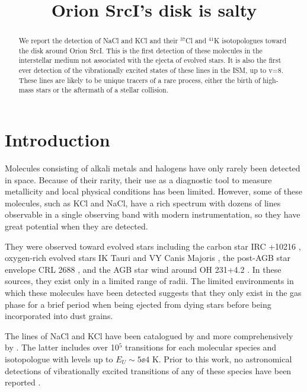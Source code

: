 \documentclass[twocolumn]{aastex62}
\newcommand{\sourcei}{SrcI\xspace}
\newcommand{\bam}[1]{\textcolor{green!65!black}{\textbf{[BAM: #1]}}}
\newcommand{\ag}[1]{\textcolor{red!65!black}{\textbf{[AG: #1]}}}
\begin{document}


\title{Orion \sourcei's disk is salty}
\begin{abstract}
    We report the detection of NaCl and KCl and their $^{37}$Cl and $^{41}$K
    isotopologues toward the disk around Orion \sourcei.
    This is the first detection of these molecules in the interstellar
    medium not associated with the ejecta of evolved stars.  It is also
    the first ever detection of the vibrationally excited states of these
    lines in the ISM, up to v=8.
    These lines are likely to be unique tracers of a rare process, either
    the birth of high-mass stars or the aftermath of a stellar collision.
\end{abstract}

\section{Introduction}
Molecules consisting of alkali metals and halogens have only rarely been
detected in space.  Because of their rarity, their use as a diagnostic
tool to measure metallicity and local physical conditions has been limited.
However, some of these molecules, such as KCl and NaCl, have a rich spectrum
with dozens of lines observable in a single observing band with modern
instrumentation, so they have great potential when they are detected.

They were observed toward evolved stars including the carbon star IRC
+10216 \citep{Cernicharo1987a}, oxygen-rich evolved stars IK Tauri and VY Canis
Majoris \citep{Milam2007a}, the post-AGB star envelope CRL 2688
\citep{Highberger2003a}, and the AGB star wind around OH 231+4.2
\citep{Sanchez-Contreras2018a}.  In these sources, they exist only in a limited
range of radii.  The limited environments in which these molecules have been
detected suggests that they only exist in the gas phase for a brief period when
being ejected from dying stars before being incorporated into dust grains.

The lines of NaCl and KCl have been catalogued by \citet{Caris2004a} and more
comprehensively by \citet{Barton2014a}.  The latter includes over 10$^5$
transitions for each molecular species and isotopologue with levels up to
$E_U\sim5\ee{4}$ K.  Prior to
this work, no astronomical detections of vibrationally excited transitions of
any of these species have been reported \citep[e.g., see the review
by][]{McGuire2018a}.
\end{document}
